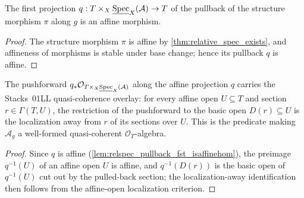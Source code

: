 \begin{lemma}
  \label{lem:relspec_pullback_fst_isaffinehom}
  The first projection
  \(q : T \times_X \underline{\operatorname{Spec}}_X(\mathcal{A}) \to T\) of the pullback of the
  structure morphism \(\pi\) along \(g\) is an affine morphism.
\end{lemma}

\begin{proof}
  The structure morphism \(\pi\) is affine by \cref{thm:relative_spec_exists}, and
  affineness of morphisms is stable under base change; hence its pullback \(q\) is
  affine.
\end{proof}

\begin{lemma}
  \label{lem:relspec_pullback_coequifibered}
  The pushforward \(q_* \mathcal{O}_{T \times_X \underline{\operatorname{Spec}}_X(\mathcal{A})}\)
  along the affine projection \(q\) carries the Stacks~01LL quasi-coherence overlay:
  for every affine open \(U \subseteq T\) and section \(r \in \Gamma(T, U)\), the
  restriction of the pushforward to the basic open \(D(r) \subseteq U\) is the
  localization away from \(r\) of its sections over \(U\). This is the predicate making
  \(\mathcal{A}_g\) a well-formed quasi-coherent \(\mathcal{O}_T\)-algebra.
\end{lemma}

\begin{proof}
  Since \(q\) is affine (\cref{lem:relspec_pullback_fst_isaffinehom}), the preimage
  \(q^{-1}(U)\) of an affine open \(U\) is affine, and \(q^{-1}(D(r))\) is the basic open
  of \(q^{-1}(U)\) cut out by the pulled-back section; the localization-away
  identification then follows from the affine-open localization criterion.
\end{proof}

